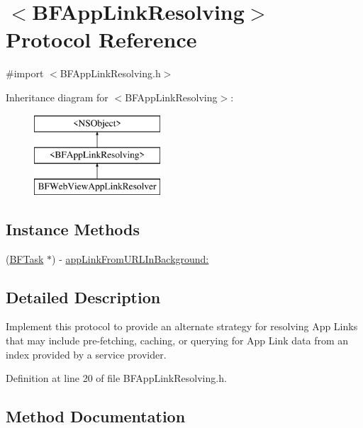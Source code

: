 \hypertarget{protocol_b_f_app_link_resolving-p}{}\section{$<$B\+F\+App\+Link\+Resolving$>$ Protocol Reference}
\label{protocol_b_f_app_link_resolving-p}


{\ttfamily \#import $<$B\+F\+App\+Link\+Resolving.\+h$>$}

Inheritance diagram for $<$B\+F\+App\+Link\+Resolving$>$\+:\begin{figure}[H]
\begin{center}
\leavevmode
\includegraphics[height=3.000000cm]{protocol_b_f_app_link_resolving-p}
\end{center}
\end{figure}
\subsection*{Instance Methods}
\begin{DoxyCompactItemize}
\item 
(\hyperlink{interface_b_f_task}{B\+F\+Task} $\ast$) -\/ \hyperlink{protocol_b_f_app_link_resolving-p_a78b6f44fe77610b147cb08dc1644cc35}{app\+Link\+From\+U\+R\+L\+In\+Background\+:}
\end{DoxyCompactItemize}


\subsection{Detailed Description}
Implement this protocol to provide an alternate strategy for resolving App Links that may include pre-\/fetching, caching, or querying for App Link data from an index provided by a service provider. 

Definition at line 20 of file B\+F\+App\+Link\+Resolving.\+h.



\subsection{Method Documentation}
\hypertarget{protocol_b_f_app_link_resolving-p_a78b6f44fe77610b147cb08dc1644cc35}{}
